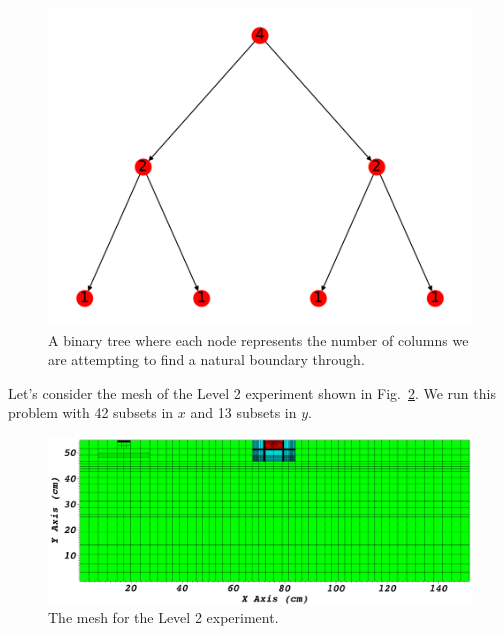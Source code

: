 \begin{figure}[h]
\centering
\includegraphics[scale=0.75]{../figures/binary_tree.pdf}
\caption{A binary tree where each node represents the number of columns we are attempting to find a natural boundary through.}
\label{binary_tree}
\end{figure}

Let's consider the mesh of the Level 2 experiment shown in Fig.~\ref{level2_nocut}.
We run this problem with 42 subsets in $x$ and 13 subsets in $y$.


\begin{figure}[h]
\centering
\includegraphics[scale=0.3]{../../figures/level2_nocut.png}
\caption{The mesh for the Level 2 experiment.}
\label{level2_nocut}
\end{figure}

